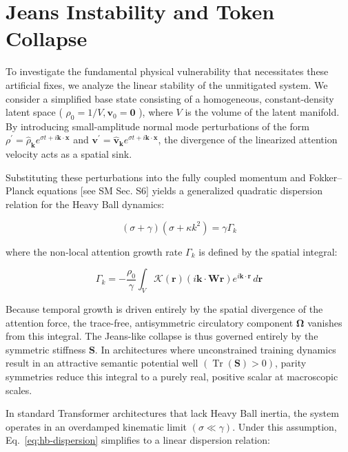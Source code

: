\documentclass[10pt]{article}
\begin{document}
\section{Jeans Instability and Token Collapse}

To investigate the fundamental physical vulnerability that necessitates these artificial fixes, we analyze the linear stability of the unmitigated system. We consider a simplified base state consisting of a homogeneous, constant-density latent space ( $\rho_{0}=1 / V, \mathbf{v}_{0}=\mathbf{0}$ ), where $V$ is the volume of the latent manifold. By introducing small-amplitude normal mode perturbations of the form $\rho^{\prime}=\hat{\rho}_{\mathbf{k}} e^{\sigma t+i \mathbf{k} \cdot \mathbf{x}}$ and $\mathbf{v}^{\prime}=\hat{\mathbf{v}}_{\mathbf{k}} e^{\sigma t+i \mathbf{k} \cdot \mathbf{x}}$, the divergence of the linearized attention velocity acts as a spatial sink.

Substituting these perturbations into the fully coupled momentum and Fokker--Planck equations [see SM Sec. S6] yields a generalized quadratic dispersion relation for the Heavy Ball dynamics:


\begin{equation}
\label{eq:hb-dispersion}
(\sigma+\gamma)\left(\sigma+\kappa k^{2}\right)=\gamma \Gamma_{k}
\end{equation}


where the non-local attention growth rate $\Gamma_{k}$ is defined by the spatial integral:


\begin{equation}
\Gamma_{k}=-\frac{\rho_{0}}{\gamma} \int_{V} \mathcal{K}(\mathbf{r})(i \mathbf{k} \cdot \mathbf{W}\mathbf{r}) e^{i \mathbf{k} \cdot \mathbf{r}}\,d\mathbf{r}
\end{equation}


Because temporal growth is driven entirely by the spatial divergence of the attention force, the trace-free, antisymmetric circulatory component $\boldsymbol{\Omega}$ vanishes from this integral. The Jeans-like collapse is thus governed entirely by the symmetric stiffness $\mathbf{S}$. In architectures where unconstrained training dynamics result in an attractive semantic potential well $(\operatorname{Tr}(\mathbf{S})>0)$, parity symmetries reduce this integral to a purely real, positive scalar at macroscopic scales.

In standard Transformer architectures that lack Heavy Ball inertia, the system operates in an overdamped kinematic limit $(\sigma \ll \gamma)$. Under this assumption, Eq.~\eqref{eq:hb-dispersion} simplifies to a linear dispersion relation:
\end{document}
